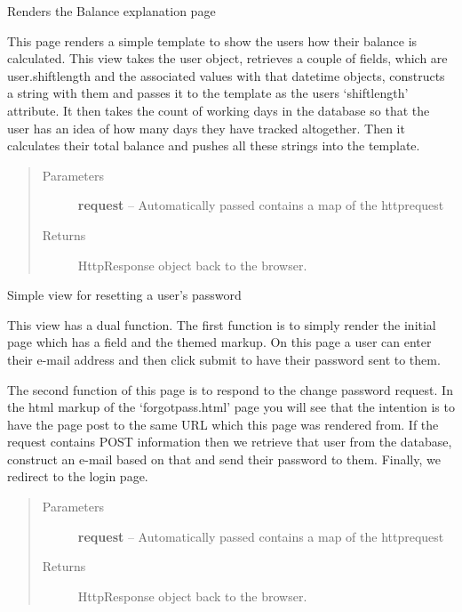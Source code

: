 \documentclass[letterpaper,10pt,english]{sphinxmanual}
\begin{document}
\begin{fulllineitems}
\label{code:timetracker.views.explain}
Renders the Balance explanation page

This page renders a simple template to show the users how their balance is
calculated. This view takes the user object, retrieves a couple of fields,
which are user.shiftlength and the associated values with that datetime
objects, constructs a string with them and passes it to the template as
the users `shiftlength' attribute. It then takes the count of working
days in the database so that the user has an idea of how many days they
have tracked altogether. Then it calculates their total balance and pushes
all these strings into the template.
\begin{quote}\begin{description}
\item[{Parameters}] \leavevmode
\textbf{request} -- Automatically passed contains a map of the httprequest

\item[{Returns}] \leavevmode
HttpResponse object back to the browser.

\end{description}\end{quote}

\end{fulllineitems}


\begin{fulllineitems}
\label{code:timetracker.views.forgot_pass}
Simple view for resetting a user's password

This view has a dual function. The first function is to simply render the
initial page which has a field and the themed markup. On this page a user
can enter their e-mail address and then click submit to have their
password sent to them.

The second function of this page is to respond to the change password
request. In the html markup of the `forgotpass.html' page you will see
that the intention is to have the page post to the same URL which this
page was rendered from. If the request contains POST information then we
retrieve that user from the database, construct an e-mail based on that
and send their password to them. Finally, we redirect to the login page.
\begin{quote}\begin{description}
\item[{Parameters}] \leavevmode
\textbf{request} -- Automatically passed contains a map of the httprequest

\item[{Returns}] \leavevmode
HttpResponse object back to the browser.

\end{description}\end{quote}

\end{fulllineitems}
\end{document}
